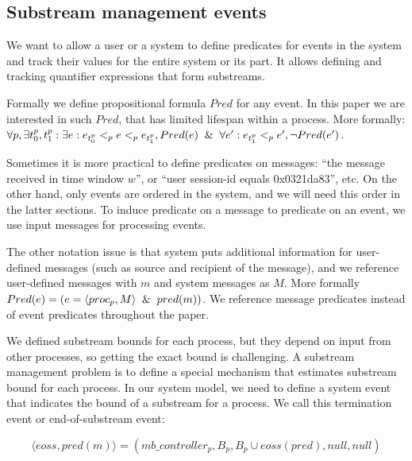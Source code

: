 
\subsection{Substream management events}
We want to allow a user or a system to define predicates for events in the system and track their values for the entire system or its part. It allows defining and tracking quantifier expressions that form substreams.

Formally we define propositional formula $Pred$ for any event. In this paper we are interested in such $Pred$, that has limited lifespan within a process. More formally: $\forall p, \exists t_0^p, t_1^p: \exists e: e_{t_0^p} <_p e <_p e_{t_1^p}, Pred(e) \And \forall e': e_{t_1^p} <_p e', \neg Pred(e')$.

Sometimes it is more practical to define predicates on messages: ``the message received in time window $w$'', or ``user session-id equals 0x0321da83'', etc. On the other hand, only events are ordered in the system, and we will need this order in the latter sections. To induce predicate on a message to predicate on an event, we use input messages for processing events.

The other notation issue is that system puts additional information for user-defined messages (such as source and recipient of the message), and we reference user-defined messages with $m$ and system messages as $M$. More formally $Pred(e) = (e=\langle proc_p, M \rangle \And pred(m))$. We reference message predicates instead of event predicates throughout the paper.

We defined substream bounds for each process, but they depend on input from other processes, so getting the exact bound is challenging. A substream management problem is to define a special mechanism that estimates substream bound for each process. In our system model, we need to define a system event that indicates the bound of a substream for a process. We call this termination event or end-of-substream event:

$$\langle eoss, pred(m)\rangle = (mb\_controller_p, B_p, B_p\cup eoss(pred), null, null)$$ 


